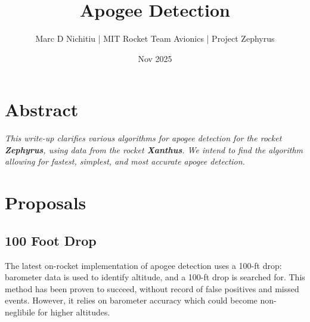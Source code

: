 \documentclass{amsdtx}
\title{\sc Apogee Detection}
\author{\sc Marc D Nichitiu | MIT Rocket Team Avionics | Project Zephyrus}
\date{\sc 26 Nov 2025}
\begin{document}
\maketitle    
\section{Abstract}
\textit{This write-up clarifies various algorithms for apogee detection for the rocket \textbf{Zephyrus}, using data from the rocket \textbf{Xanthus}. We intend to find the algorithm allowing for fastest, simplest, and most accurate apogee detection.}
\section{Proposals}
\subsection{100 Foot Drop}
The latest on-rocket implementation of apogee detection uses a 100-ft drop: barometer data is used to identify altitude, and a 100-ft drop is searched for. This method has been proven to succeed, without record of false positives and missed events. However, it relies on barometer accuracy which could become non-neglibile for higher altitudes. 
\end{document}
